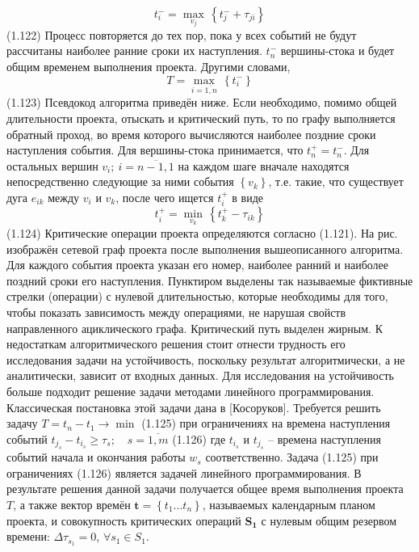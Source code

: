 	\[t_{i}^{-}=\underset{{{v}_{j}}}{\mathop{\max }}\,\left\{ t_{j}^{-}+{{\tau }_{ji}} \right\}\] 	(1.122)
Процесс повторяется до тех пор, пока у всех событий не будут рассчитаны наиболее ранние сроки их наступления. $t_{n}^{-}$ вершины-стока и будет общим временем выполнения проекта. Другими словами,
	\[T=\underset{i=\overline{1,n}}{\mathop{\max }}\,\left\{ t_{i}^{-} \right\}\] 	(1.123)
Псевдокод алгоритма приведён ниже.
Если необходимо, помимо общей длительности проекта, отыскать и критический путь, то по графу выполняется обратный проход, во время которого вычисляются наиболее поздние сроки наступления события. Для вершины-стока принимается, что $t_{n}^{+}=t_{n}^{-}$. Для остальных вершин ${{v}_{i}};\ i=\overline{n-1,1}$ на каждом шаге вначале находятся непосредственно следующие за ними события $\left\{ {{v}_{k}} \right\}$, т.е. такие, что существует дуга ${{e}_{ik}}$ между ${{v}_{i}}$ и ${{v}_{k}}$, после чего ищется $t_{i}^{+}$ в виде
	\[t_{i}^{+}=\underset{{{v}_{k}}}{\mathop{\min }}\,\left\{ t_{k}^{+}-{{\tau }_{ik}} \right\}\] 	(1.124)
Критические операции проекта определяются согласно (1.121).
На рис. изображён сетевой граф проекта после выполнения вышеописанного алгоритма. Для каждого события проекта указан его номер, наиболее ранний и наиболее поздний сроки его наступления. Пунктиром выделены так называемые фиктивные стрелки (операции) с нулевой длительностью, которые необходимы для того, чтобы показать зависимость между операциями, не нарушая свойств направленного ациклического графа. Критический путь выделен жирным.
К недостаткам алгоритмического решения стоит отнести трудность его исследования задачи на устойчивость, поскольку результат алгоритмически, а не аналитически, зависит от входных данных. Для исследования на устойчивость больше подходит решение задачи методами линейного программирования. Классическая постановка этой задачи дана в [Косоруков]. Требуется решить задачу
	$T={{t}_{n}}-{{t}_{1}}\to \min $ 	(1.125)
при ограничениях на времена наступления событий
	${{t}_{{{j}_{s}}}}-{{t}_{{{i}_{s}}}}\ge {{\tau }_{s}};\quad s=\overline{1,m}$ 	(1.126)
где ${{t}_{{{i}_{s}}}}$ и ${{t}_{{{j}_{s}}}}$ – времена наступления событий начала и окончания работы ${{w}_{s}}$ соответственно. Задача (1.125) при ограничениях (1.126) является задачей линейного программирования.
В результате решения данной задачи получается общее время выполнения проекта $T$, а также вектор времён $\mathbf{t}=\left\{ {{t}_{1}}...{{t}_{n}} \right\}$, называемых календарным планом проекта, и совокупность критических операций ${{\mathbf{S}}_{\mathbf{1}}}$ с нулевым общим резервом времени: $\Delta {{\tau }_{{{s}_{1}}}}=0$, $\forall s_1 \in S_1$.
